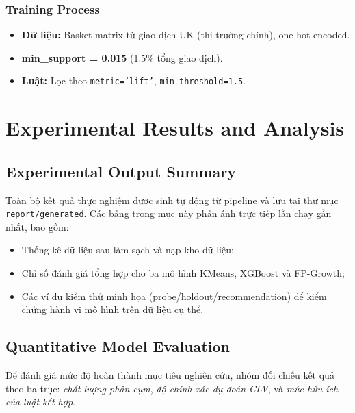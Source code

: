 \documentclass[a4paper,12pt]{article}
\begin{document}
\subsubsection{Training Process}
\begin{itemize}
    \item \textbf{Dữ liệu:} Basket matrix từ giao dịch UK (thị trường chính), one-hot encoded.
    \item \textbf{min\_support = 0.015} (1.5\% tổng giao dịch).
    \item \textbf{Luật:} Lọc theo \texttt{metric='lift'}, \texttt{min\_threshold=1.5}.
\end{itemize}

\section{Experimental Results and Analysis}

\subsection{Experimental Output Summary}
Toàn bộ kết quả thực nghiệm được sinh tự động từ pipeline và lưu tại thư mục \texttt{report/generated}. Các bảng trong mục này phản ánh trực tiếp lần chạy gần nhất, bao gồm:
\begin{itemize}
    \item Thống kê dữ liệu sau làm sạch và nạp kho dữ liệu;
    \item Chỉ số đánh giá tổng hợp cho ba mô hình KMeans, XGBoost và FP-Growth;
    \item Các ví dụ kiểm thử minh họa (probe/holdout/recommendation) để kiểm chứng hành vi mô hình trên dữ liệu cụ thể.
\end{itemize}


\subsection{Quantitative Model Evaluation}
Để đánh giá mức độ hoàn thành mục tiêu nghiên cứu, nhóm đối chiếu kết quả theo ba trục: \textit{chất lượng phân cụm}, \textit{độ chính xác dự đoán CLV}, và \textit{mức hữu ích của luật kết hợp}.
\end{document}
